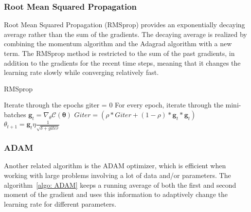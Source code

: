 \documentclass[english,notitlepage,reprint,nofootinbib]{revtex4–2}  %
\begin{document}
\subsubsection{Root Mean Squared Propagation}
Root Mean Squared Propagation (RMSprop) provides an exponentially decaying average rather than the sum of the gradients. The decaying average is realized by combining the momentum algorithm and the Adagrad algorithm with a new term. The RMSprop method is restricted to the sum of the past gradients, in addition to the gradients for the recent time steps, meaning that it changes the learning rate slowly while converging relatively fast. 

\begin{algorithm}[H]
    \caption{RMSprop}\label{algo: RMSprop}
    \begin{algorithmic}
        \State Iterate through the epochs 
        giter = 0 
        \State For every epoch, iterate through the mini-batches 
        \State $\mathbf{g}_t =\nabla_\theta \mathcal{C}(\boldsymbol{\theta})$
        \State $Giter = (\rho*Giter+(1-\rho)*\mathbf{g}_t*\mathbf{g}_t)$
        \State $\theta_{t+1} = \mathbf{g}_t \eta \frac{1}{\sqrt{\delta + giter}}$
    \end{algorithmic}
\end{algorithm}

\subsubsection{ADAM} %
Another related algorithm is the ADAM optimizer, which is efficient when working with large problems involving a lot of data and/or parameters. 
The algorithm~\ref{algo: ADAM} keeps a running average of both the first and second moment of the gradient and uses this information to adaptively change the learning rate for different parameters. 
\end{document}
